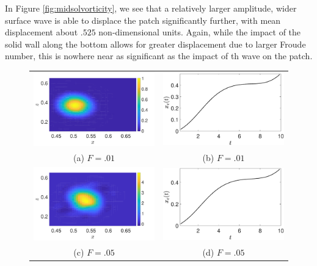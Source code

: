 \documentclass[a4paper,11pt]{article}
\begin{document}
In Figure \ref{fig:midsolvorticity}, we see that a relatively larger amplitude, wider surface wave is able to displace the patch significantly further, with mean displacement about $.525$ non-dimensional units.  Again, while the impact of the solid wall along the bottom allows for greater displacement due to larger Froude number, this is nowhere near as significant as the impact of th wave on the patch.  
\begin{figure}
\centering
\begin{tabular}{cc}
\includegraphics[width=.45\textwidth]{vorticity_wm_1_modu_pt6} &  \includegraphics[width=.45\textwidth]{com_wm_1_modu_pt6}\\
(a) $F=.01$ & (b) $F=.01$\\
\includegraphics[width=.45\textwidth]{vorticity_wm_5_modu_pt6} & \includegraphics[width=.45\textwidth]{com_wm_5_modu_pt6}\\
(c) $F=.05$ & (d) $F=.05$\\

\end{tabular}
\end{figure}
\end{document}

